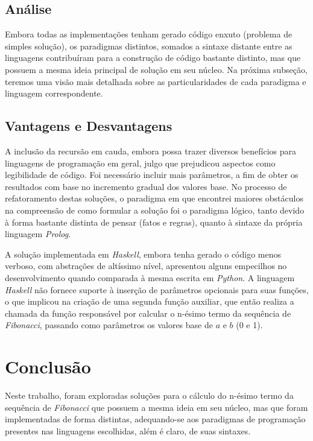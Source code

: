 \documentclass[a4paper, 12pt]{article}
\begin{document}
\subsection{Análise}

Embora todas as implementações tenham gerado código enxuto (problema de simples solução), os paradigmas distintos, somados a sintaxe distante entre as linguagens contribuíram para a construção de código bastante distinto, mas que possuem a mesma ideia principal de solução em seu núcleo. Na próxima subseção, teremos uma visão mais detalhada sobre as particularidades de cada paradigma e linguagem correspondente.

\subsection{Vantagens e Desvantagens}

A inclusão da recursão em cauda, embora possa trazer diversos benefícios para linguagens de programação em geral, julgo que prejudicou aspectos como legibilidade de código. Foi necessário incluir mais parâmetros, a fim de obter os resultados com base no incremento gradual dos valores base. No processo de refatoramento destas soluções, o paradigma em que encontrei maiores obstáculos na compreensão de como formular a solução foi o paradigma lógico, tanto devido à forma bastante distinta de pensar (fatos e regras), quanto à sintaxe da própria linguagem \emph{Prolog}.

A solução implementada em \emph{Haskell}, embora tenha gerado o código menos verboso, com abstrações de altíssimo nível, apresentou alguns empecilhos no desenvolvimento quando comparada à mesma escrita em \emph{Python}. A linguagem \emph{Haskell} não fornece suporte à inserção de parâmetros opcionais para suas funções, o que implicou na criação de uma segunda função auxiliar, que então realiza a chamada da função responsável por calcular o n-ésimo termo da sequência de \emph{Fibonacci}, passando como parâmetros os valores base de \(a\) e \(b\) (0 e 1).

\section{Conclusão}

Neste trabalho, foram exploradas soluções para o cálculo do n-ésimo termo da sequência de \emph{Fibonacci} que possuem a mesma ideia em seu núcleo, mas que foram implementadas de forma distintas, adequando-se aos paradigmas de programação presentes nas linguagens escolhidas, além é claro, de suas sintaxes.
\end{document}
